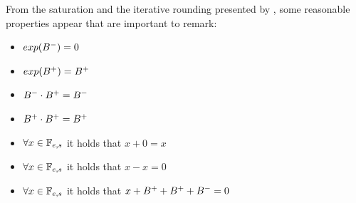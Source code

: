 From the saturation and the iterative rounding presented by \citet{toyota}, some reasonable properties appear that are important to remark:
\begin{itemize}
        \item $exp(B^{-}) = 0$
        \item $exp(B^{+}) = B^{+}$
        \item $B^{-} \cdot B^{+} = B^{-}$
        \item $B^{+} \cdot B^{+} = B^{+}$
        \item $\forall x \in \mathbb{F}_{e,s}$ it holds that $x+0 = x$ 
        \item $\forall x \in \mathbb{F}_{e,s}$ it holds that $x-x = 0$ 
        \item $\forall x \in \mathbb{F}_{e,s}$ it holds that $x + B^{+} + B^{+} + B^{-} =  0$  
\end{itemize}





